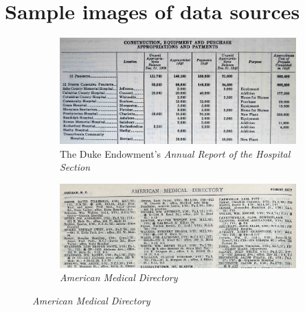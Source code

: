 \documentclass[12pt]{article}
\begin{document}
\section[Sample images of data sources]{Sample images of data sources\label{sec:appx-images-data}}
\setcounter{table}{0}
\setcounter{figure}{0}

\begin{figure}[!ht]
    \centering
    \caption[Sample images]{Sample images\label{fig:data-source-images}}
    \begin{minipage}{1.0\linewidth}
    \centering
    \begin{subfigure}[b]{1.0\textwidth}
        \centering
        \caption{The Duke Endowment's \textit{Annual Report of the Hospital Section}}
        \includegraphics[width=\linewidth]{../pics/sample_image_duke_capital_ex.jpg}
    \end{subfigure}
    \vspace{12pt}
    \begin{subfigure}[b]{1.0\textwidth}
        \centering
        \caption{\textit{American Medical Directory}} %
        \includegraphics[width=\linewidth]{../pics/sample_image_amd_1934.jpg}
    \end{subfigure}
    \end{minipage}
\end{figure}
\restoregeometry
\end{document}
